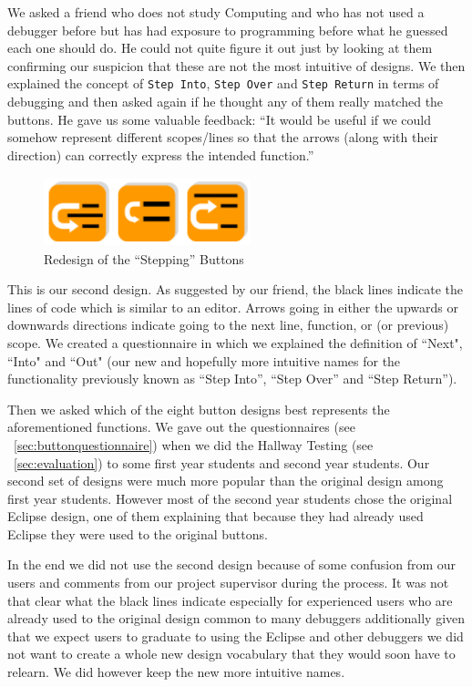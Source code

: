 \documentclass[11pt, a4paper]{article}
\newcommand{\cmd}[1]{{\tt #1}}
\begin{document}
We asked a friend who does not study Computing and who has not used a debugger before but has had exposure to programming before what he guessed each one should do.
He could not quite figure it out just by looking at them confirming our suspicion that these are not the most intuitive of designs.
We then explained the concept of \cmd{Step Into}, \cmd{Step Over} and \cmd{Step Return} in terms of debugging and then asked again if he thought any of them really matched the buttons.
He gave us some valuable feedback: ``It would be useful if we could somehow represent different scopes/lines so that the arrows (along with their direction) can correctly express the intended function.''
\begin{figure}[h!]
\centering
\includegraphics[height=20mm,width=60mm]{buttons2.png}
\caption{Redesign of the ``Stepping'' Buttons}
\end{figure}

This is our second design.
As suggested by our friend, the black lines indicate the lines of code which is similar to an editor.
Arrows going in either the upwards or downwards directions indicate going to the next line, function, or (or previous) scope.
We created a questionnaire in which we explained the definition of ``Next", ``Into" and ``Out" (our new and hopefully more intuitive names for the functionality previously known as ``Step Into'', ``Step Over'' and ``Step Return'').

Then we asked which of the eight button designs best represents the aforementioned functions.
We gave out the questionnaires (see ~\cref{sec:buttonquestionnaire}) when we did the Hallway Testing (see ~\cref{sec:evaluation}) to some first year students and second year students.
Our second set of designs were much more popular than the original design among first year students.
However most of the second year students chose the original Eclipse design, one of them explaining that because they had already used Eclipse they were used to the original buttons.

In the end we did not use the second design because of some confusion from our users and comments from our project supervisor during the process. 
It was not that clear what the black lines indicate especially for experienced users who are already used to the original design common to many debuggers additionally given that we expect users to graduate to using the Eclipse and other debuggers we did not want to create a whole new design vocabulary that they would soon have to relearn. 
We did however keep the new more intuitive names.
\end{document}
